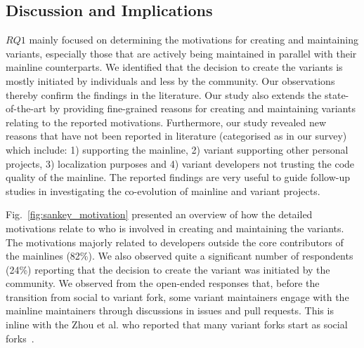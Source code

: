\subsection{Discussion and Implications}
$RQ1$ mainly focused on determining the motivations for creating and maintaining variants, especially those that are actively being maintained in parallel with their mainline counterparts.
We identified that the decision to create the variants is mostly initiated by individuals and less by the community.
Our observations thereby confirm the findings in the literature.
Our study also extends the state-of-the-art by providing fine-grained reasons for creating and maintaining variants relating to the reported motivations.
Furthermore, our study revealed new reasons that have not been reported in literature (categorised as  in our survey) which include: 1) supporting the mainline, 2) variant supporting other personal projects, 3) localization purposes and 4) variant developers not trusting the code quality of the mainline.
The reported findings are very useful to guide follow-up studies in investigating the co-evolution of mainline and variant projects.

Fig.~\ref{fig:sankey_motivation} presented an overview of how the detailed motivations relate to who is involved in creating and maintaining the variants. 
The motivations majorly related to developers outside the core contributors of the mainlines  (82\%). We also observed quite a significant number of respondents (24\%) reporting that the decision to create the variant was initiated by the community. We  observed from the open-ended responses that, before the transition from social to variant fork, some variant maintainers engage with the mainline maintainers through discussions in issues and pull requests. This is inline with the Zhou et al. who reported that many variant forks start as social forks~\cite{Zhou:2020}.

